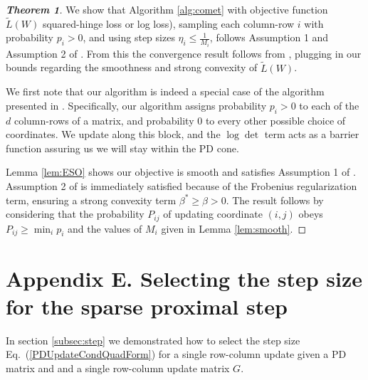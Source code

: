 \documentclass[twoside,11pt]{article}
\newcommand\mat[1]{{#1}}
\newcommand{\W}{\mat{W}}
\newcommand{\Pp}{\mat{P}}
\newcommand{\tL}{\tilde{L}(\W)}
\renewcommand{\eqref}[1]{Eq.~(\ref{#1})}
\begin{document}

\begin{proof}[{\bf{Theorem 1}}]
We show that Algorithm \ref{alg:comet} with objective function $\tL$ squared-hinge loss or log loss), sampling each column-row $i$ with probability $p_i >0$, and using step sizes $\eta_i \leq \frac{1}{M_i}$, follows Assumption 1 and Assumption 2 of \citet{richtarik2013optimal}. From this the convergence result follows from \citeauthor[Theorem 3]{richtarik2013optimal}, plugging in our bounds regarding the smoothness and strong convexity of $\tL$.

We first note that our algorithm is indeed a special case of the algorithm presented in \citet{richtarik2013optimal}. Specifically, our algorithm assigns probability $p_i > 0 $ to each of the $d$ column-rows of a matrix, and probability $0$ to every other possible choice of coordinates. We update along this block, and the $\log \det$ term acts as a barrier function
assuring us we will stay within the PD cone.

Lemma \ref{lem:ESO} shows our objective is smooth and satisfies Assumption 1 of \citeauthor{richtarik2013optimal}. Assumption 2 of \citeauthor{richtarik2013optimal} is immediately satisfied because of the Frobenius regularization term, ensuring a strong convexity term $\beta^* \geq \beta > 0$. The result follows by considering that the probability $\Pp_{ij}$ of updating coordinate $(i,j)$ obeys $\Pp_{ij} \geq \min_i p_i $ and the values of $M_i$ given in Lemma \ref{lem:smooth}.

\end{proof}

\section*{Appendix E. Selecting the step size for the sparse proximal step}
In section \ref{subsec:step} we demonstrated how to select the step size \eqref{PDUpdateCondQuadForm} for a single row-column update given a PD matrix and and a single row-column update matrix $\mat{G}$. 
\end{document}
